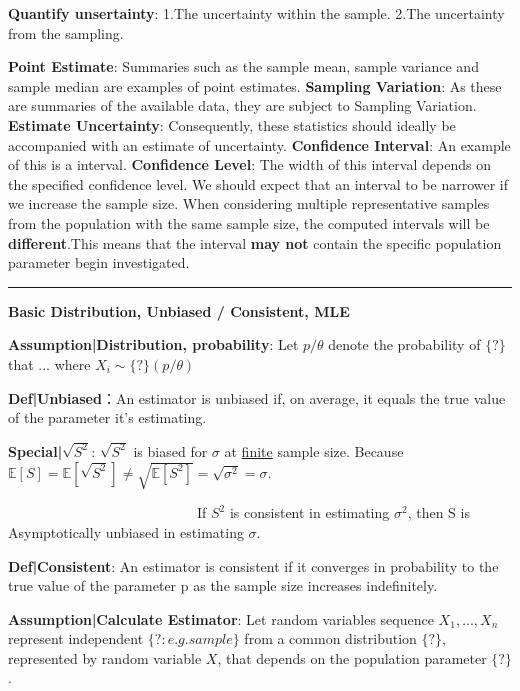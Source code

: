 \documentclass[9pt]{article}
\begin{document}
    \textbf{Quantify unsertainty}: 1.The uncertainty within the sample. 2.The uncertainty from the sampling.

    \textbf{Point Estimate}: Summaries such as the sample mean, sample variance and sample median are examples of point estimates.
    \textbf{Sampling Variation}: As these are summaries of the available data, they are subject to Sampling Variation.
    \textbf{Estimate Uncertainty}: Consequently, these statistics should ideally be accompanied with an estimate of uncertainty.
    \textbf{Confidence Interval}: An example of this is a interval.
    \textbf{Confidence Level}: The width of this interval depends on the specified confidence level. We should expect that an interval to be narrower if we increase the sample size. When considering multiple representative samples from the population with the same sample size, the computed intervals will be \textbf{different}.This means that the interval \textbf{may not} contain the specific population parameter begin investigated.

    \vspace{-0.2cm}
    \rule{\linewidth}{0.2pt}
    \vspace{-0.4cm}

    \fontsize{10}{10}\selectfont

    \textbf{Basic Distribution, Unbiased / Consistent, MLE}

    \textbf{Assumption|Distribution, probability}: Let $p/\theta$ denote the probability of $\{?\}$ that ... where $X_i\sim \{?\}(p/\theta)$

    \textbf{Def|Unbiased}：An estimator is unbiased if, on average, it equals the true value of the parameter it's estimating.

    \textbf{Special|$\sqrt{S^2}$}: $\sqrt{S^2}$ is biased for $\sigma$ at \underline{finite} sample size. Because $\mathbb{E}[S]=\mathbb{E}[\sqrt{S^2}]\ne\sqrt{\mathbb{E}[S^2]}=\sqrt{\sigma^2}=\sigma$.

    \ \ \ \ \ \ \ \ \ \ \ \ \ \ \ \ \ \ \ \ \ \ \ \ \ \ \ If $S^2$ is consistent in estimating $\sigma^2$, then S is Asymptotically unbiased in estimating $\sigma$.

    \textbf{Def|Consistent}: An estimator is consistent if it converges in probability to the true value of the parameter p as the sample size increases indefinitely.

    \textbf{Assumption|Calculate Estimator}: Let random variables sequence $X_1,...,X_n$ represent independent $\{?:e.g.sample\}$ from a common distribution $\{?\}$, represented by random variable $X$, that depends on the population parameter $\{?\}$.
\end{document}
